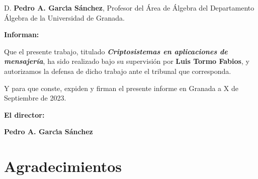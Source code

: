 D. \textbf{Pedro A. Garcı́a Sánchez}, Profesor del Área de Álgebra del Departamento Álgebra de la Universidad de Granada.

\vspace{0.5cm}

\textbf{Informan:}

\vspace{0.5cm}

Que el presente trabajo, titulado \textit{\textbf{Criptosistemas en aplicaciones de mensajería}},
ha sido realizado bajo su supervisión por \textbf{Luis Tormo Fabios}, y autorizamos la defensa de dicho trabajo ante el tribunal
que corresponda.

\vspace{0.5cm}

Y para que conste, expiden y firman el presente informe en Granada a X de Septiembre de 2023.

\vspace{1cm}

\textbf{El director:}

\vspace{5cm}

\noindent \textbf{Pedro A. Garcı́a Sánchez}

\chapter*{Agradecimientos}
\thispagestyle{empty}

       \vspace{1cm}


